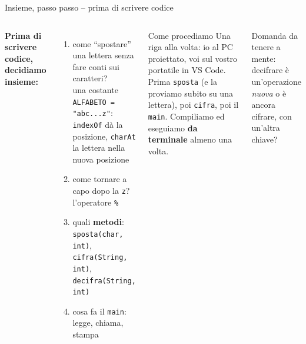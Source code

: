 \documentclass[10pt,aspectratio=169]{beamer}
\begin{document}
\begin{frame}[fragile]{Insieme, passo passo -- prima di scrivere codice}


\begin{columns}[T]
\small
\textbf{Prima di scrivere codice, decidiamo insieme:}
\begin{enumerate}\itemsep=2pt
    \item come ``spostare'' una lettera senza fare conti sui caratteri? \\ \textrightarrow{} una costante \texttt{ALFABETO = "abc...z"}: \texttt{indexOf} dà la posizione, \texttt{charAt} la lettera nella nuova posizione
    \item come tornare a capo dopo la \texttt{z}? \textrightarrow{} l'operatore \texttt{\%}
    \item quali \textbf{metodi}: \texttt{sposta(char, int)}, \texttt{cifra(String, int)}, \texttt{decifra(String, int)}
    \item cosa fa il \texttt{main}: legge, chiama, stampa
\end{enumerate}
\begin{block}{Come procediamo}
Una riga alla volta: io al PC proiettato, voi sul vostro portatile in VS Code. Prima \texttt{sposta} (e la proviamo subito su una lettera), poi \texttt{cifra}, poi il \texttt{main}. Compiliamo ed eseguiamo \textbf{da terminale} almeno una volta.
\end{block}
\small Domanda da tenere a mente: decifrare è un'operazione \emph{nuova} o è ancora cifrare, con un'altra chiave?
\end{columns}
\end{frame}
\end{document}
